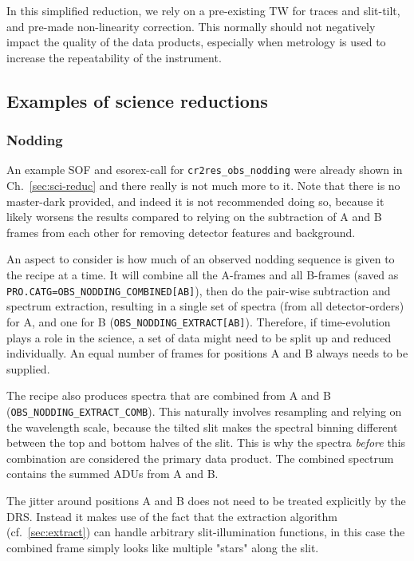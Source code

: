In this simplified reduction, we rely on a pre-existing TW for traces and slit-tilt, and pre-made non-linearity correction. This normally should not negatively impact the quality of the data products, especially when metrology is used to increase the repeatability of the instrument.

\subsection{Examples of science reductions}

\subsubsection{Nodding}

An example SOF and esorex-call for \verb!cr2res_obs_nodding! were already shown
in Ch.~\ref{sec:sci-reduc} and there really is not much more to it. Note that
there is no master-dark provided, and indeed it is not recommended doing so,
because it likely worsens the results compared to relying on the subtraction of
A and B frames from each other for removing detector features and background.

An aspect to consider is how much of an observed nodding sequence is given to
the recipe at a time. It will combine all the A-frames and all B-frames (saved
as \verb!PRO.CATG=OBS_NODDING_COMBINED[AB]!), then do the pair-wise subtraction
and spectrum extraction, resulting in a single set of spectra (from all
detector-orders) for A, and one for B (\verb!OBS_NODDING_EXTRACT[AB]!).
Therefore, if time-evolution plays a role in the science, a set of data might
need to be split up and reduced individually. An equal number of frames for
positions A and B always needs to be supplied.

The recipe also produces spectra that are combined from A and B
(\verb!OBS_NODDING_EXTRACT_COMB!). This naturally involves resampling and
relying on the wavelength scale, because the tilted slit makes the spectral
binning different between the top and bottom halves of the slit. This is why the
spectra \emph{before} this combination are considered the primary data product.
The combined spectrum contains the summed ADUs from A and B.

The jitter around positions A and B does not need to be treated explicitly by
the DRS. Instead it makes use of the fact that the extraction algorithm
(cf.~\ref{sec:extract}) can handle arbitrary slit-illumination functions, in
this case the combined frame simply looks like multiple "stars" along the slit.

